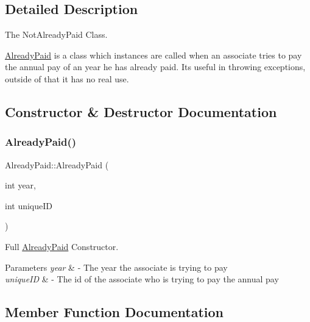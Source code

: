 \subsection{Detailed Description}
The Not\+Already\+Paid Class. 

\mbox{\hyperlink{classAlreadyPaid}{Already\+Paid}} is a class which instances are called when an associate tries to pay the annual pay of an year he has already paid. Its useful in throwing exceptions, outside of that it has no real use. 

\subsection{Constructor \& Destructor Documentation}
\mbox{\label{classAlreadyPaid_afa3ccdeb73e3570b346a4938a836a44e}} 
\subsubsection{\texorpdfstring{Already\+Paid()}{AlreadyPaid()}}
{\footnotesize\ttfamily Already\+Paid\+::\+Already\+Paid (\begin{DoxyParamCaption}\item[{int}]{year,  }\item[{int}]{unique\+ID }\end{DoxyParamCaption})\hspace{0.3cm}{\ttfamily [inline]}}



Full \mbox{\hyperlink{classAlreadyPaid}{Already\+Paid}} Constructor. 


\begin{DoxyParams}{Parameters}
{\em year} & -\/ The year the associate is trying to pay \\
\hline
{\em unique\+ID} & -\/ The id of the associate who is trying to pay the annual pay \\
\hline
\end{DoxyParams}


\subsection{Member Function Documentation}
\mbox{\label{classAlreadyPaid_a54d1869f925f98bb8621131debf5f2c8}} 
